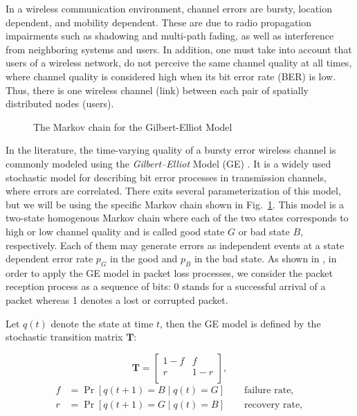 In a wireless communication environment, channel errors are bursty, location
dependent, and mobility dependent. These are due to radio propagation
impairments such as shadowing and multi-path fading, as well as interference
from neighboring systems and users. In addition, one must take into account that
users of a wireless network, do not perceive the same channel quality at all
times, where channel quality is considered high when its bit error rate (BER) is
low. Thus, there is one wireless channel (link) between each pair of spatially
distributed nodes (users). 

\begin{figure}[htb]
  \centering
   
  \caption{The Markov chain for the Gilbert-Elliot Model}
  \label{fig:GE_FSM}
\end{figure}

In the literature, the time-varying quality of a bursty error wireless channel
is commonly modeled using the \textit{Gilbert–Elliot} Model (GE)
\cite{gilbert1960capacity, elliott1963estimates}. It is a widely used stochastic
model for describing bit error processes in transmission channels, where errors
are correlated. There exits several parameterization of this model, but we will
be using the specific Markov chain shown in Fig.~\ref{fig:GE_FSM}. This model is
a two-state homogenous Markov chain where each of the two states corresponds to
high or low channel quality and is called good state $G$ or bad state $B$,
respectively. Each of them may generate errors as independent events at a state
dependent error rate $p_G$ in the good and $p_B$ in the bad state. As shown in
\cite{hasslinger2008gilbert}, in order to apply the GE model in packet loss
processes, we consider the packet reception process as a sequence of bits: 0
stands for a successful arrival of a packet whereas 1 denotes a lost or
corrupted packet.

Let $q(t)$ denote the state at time $t$, then the GE model is defined by the
stochastic transition matrix $\boldsymbol{T}$:

\begin{equation}
  \label{eq:GE_transition}
  \boldsymbol{T} = 
  \begin{bmatrix}
    1-f & f \\
    r & 1-r \\
  \end{bmatrix},
\end{equation}
\begin{align}
  f &= \Pr[q(t+1) = B \mid q(t) = G] \qquad \textrm{failure rate}, \\
  r &= \Pr[q(t+1) = G \mid q(t) = B] \qquad \textrm{recovery rate},
\end{align}

